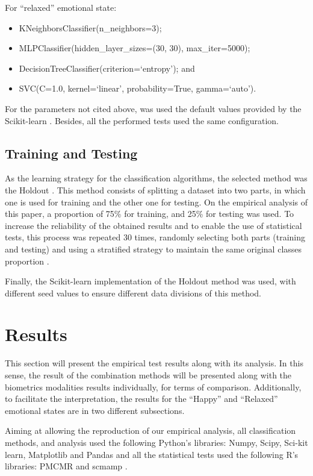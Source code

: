 \documentclass[conference]{IEEEtran}
\begin{document}
For ``relaxed'' emotional state:

\begin{itemize}
    \item KNeighborsClassifier(n\_neighbors=3);
    \item MLPClassifier(hidden\_layer\_sizes=(30, 30), max\_iter=5000);
    \item DecisionTreeClassifier(criterion=`entropy'); and
    \item SVC(C=1.0, kernel=`linear', probability=True, gamma=`auto').
\end{itemize}

For the parameters not cited above, was used the default values provided by the Scikit-learn \cite{sklearn}. Besides, all the performed tests used the same configuration.

\subsection{Training and Testing}

As the learning strategy for the classification algorithms, the selected method was the Holdout \cite{validation}. This method consists of splitting a dataset into two parts, in which one is used for training and the other one for testing. On the empirical analysis of this paper, a proportion of 75\% for training, and 25\% for testing was used. 
To increase the reliability of the obtained results and to enable the use of statistical tests, this process was repeated 30 times, randomly selecting both parts (training and testing) and using a stratified strategy to maintain the same original classes proportion \cite{faceli}.

Finally, the Scikit-learn implementation of the Holdout method was used, with different seed values to ensure different data divisions of this method. 


\section{Results}

This section will present the empirical test results along with its analysis. 
In this sense, the result of the combination methods will be presented along with the biometrics modalities results individually, for terms of comparison. 
Additionally, to facilitate the interpretation, the results for the ``Happy'' and ``Relaxed'' emotional states are in two different subsections.

Aiming at allowing the reproduction of our empirical analysis, all classification methods, and analysis used the following Python’s libraries: Numpy, Scipy, Sci-kit learn, Matplotlib and  Pandas  \cite{numpy, scipy, sklearn, matplotlib, pandas} and all the statistical tests used the following  R’s libraries:  PMCMR and scmamp \cite{PMCMR, scmamp}. 
\end{document}
